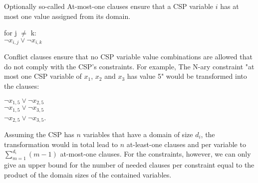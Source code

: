 Optionally so-called At-most-one clauses ensure that a CSP variable $i$ has at most one value assigned from its domain.
\begin{center}
    for j $\neq$ k:\\
    $\neg x_{i,j} \lor \neg x_{i,k}$
\end{center}

Conflict clauses ensure that no CSP variable value combinations are allowed that do not comply with the CSP's constraints.
For example, The N-ary constraint "at most one CSP variable of $x_1$, $x_2$ and $x_3$ has value 5" would be transformed into the clauses:
\begin{center}
 $\neg x_{1,5} \lor \neg x_{2,5}$\\
 $\neg x_{1,5} \lor \neg x_{3,5}$\\
 $\neg x_{2,5} \lor \neg x_{3,5}$. 
\end{center}

Assuming the CSP has $n$ variables that have a domain of size $d_i$, the transformation would in total lead to $n$ at-least-one clauses and per variable to $\sum_{m=1}^{d_i} (m-1)$ at-most-one clauses. For the constraints, however, we can only give an upper bound for the number of needed clauses per constraint equal to the product of the domain sizes of the contained variables.

